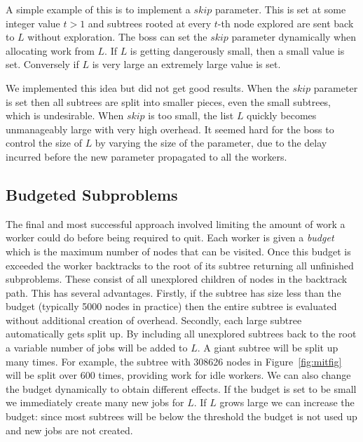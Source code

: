 \documentclass[a4paper,11pt]{article}   \usepackage{authblk} \usepackage[top=1.9cm,bottom=1.9cm,left=1.9cm,right=1.9cm]{geometry}
\begin{document}
A simple example of this is to implement a $\mathit{skip}$ parameter. 
This is set at some integer value $t>1$  and subtrees rooted
at every $t$-th node explored are 
sent back to $L$ without exploration. The boss
can set the $\mathit{skip}$ parameter dynamically when allocating work from $L$.
If $L$ is getting dangerously small, then a small value is set.
Conversely if $L$ is very large an extremely large value is set.

We implemented this idea but did not get good results. 
When the $\mathit{skip}$
parameter is set then all subtrees are split into smaller pieces,
even the small subtrees, which is undesirable.
When $\mathit{skip}$
is too small, the list $L$ quickly becomes unmanageably large
with very high overhead. 
It seemed hard for the boss to control the size of $L$
by varying the size of the parameter, due to the
delay incurred before the new parameter propagated to all the workers.

\subsection{Budgeted Subproblems}
\label{subsec:budg}

The final and 
most successful approach involved limiting
the amount of work a worker could do before being
required to quit. Each worker is given a \emph{budget}
which is the maximum number of nodes that can be visited.
Once this budget is exceeded the worker backtracks to the root
of its subtree returning all unfinished subproblems. These consist of all unexplored
children of nodes in the backtrack path.  This has several advantages.
Firstly, if the subtree has size less than the budget (typically 5000 nodes in practice)
then the entire subtree is evaluated without additional creation of overhead.
Secondly, each large subtree automatically gets split up. By including all
unexplored subtrees back to the root a variable number of jobs will be added to $L$.
A giant subtree will be split up many times. For example, the
subtree with 308626 nodes in Figure~\ref{fig:mitfig} will be split over 600 times, providing
work for idle workers. We can also change the budget dynamically to obtain different effects.
If the budget is set to be small we immediately create many new jobs for $L$. If
$L$ grows large we can increase the budget: since most subtrees will be below
the threshold the budget is not used up and  new jobs are not created. 
\end{document}
